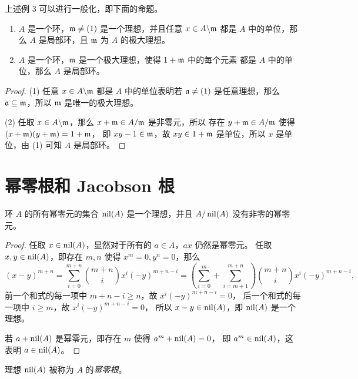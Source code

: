 上述例 3 可以进行一般化，即下面的命题。

\begin{proposition}
  \mbox{}
  \begin{enumerate}
    \item $A$ 是一个环，$\mathfrak{m}\neq (1)$ 是一个理想，并且任意 $x\in A\backslash\mathfrak{m}$
    都是 $A$ 中的单位，那么 $A$ 是局部环，且 $\mathfrak{m}$ 为 $A$ 的极大理想。
    \item $A$ 是一个环，$\mathfrak{m}$ 是一个极大理想，使得 $1+\mathfrak{m}$ 中的每个元素
    都是 $A$ 中的单位，那么 $A$ 是局部环。
  \end{enumerate}
\end{proposition}
\begin{proof}
  (1) 任意 $x\in A\backslash\mathfrak{m}$ 都是 $A$ 中的单位表明若 $\mathfrak{a}\neq (1)$
  是任意理想，那么 $\mathfrak{a}\subseteq \mathfrak{m}$，所以 $\mathfrak{m}$ 是唯一的极大理想。

  (2) 任取 $x\in A\backslash\mathfrak{m}$，那么 $x+\mathfrak{m}\in A/\mathfrak{m}$ 是非零元，所以
  存在 $y+\mathfrak{m}\in A/\mathfrak{m}$ 使得 $(x+\mathfrak{m})(y+\mathfrak{m})=1+\mathfrak{m}$，
  即 $xy-1\in\mathfrak{m}$，故 $xy\in 1+\mathfrak{m}$ 是单位，所以 $x$ 是单位，由 (1)
  可知 $A$ 是局部环。
\end{proof}

\section{幂零根和 Jacobson 根}

\begin{proposition}
  环 $A$ 的所有幂零元的集合 $\operatorname{nil}(A)$ 是一个理想，并且
  $A/\operatorname{nil}(A)$ 没有非零的幂零元。
\end{proposition}
\begin{proof}
  任取 $x\in\operatorname{nil}(A)$，显然对于所有的 $a\in A$，$ax$ 仍然是幂零元。
  任取 $x,y\in\operatorname{nil}(A)$，即存在 $m,n$ 使得 $x^m=0,y^n=0$，那么
  \[
    (x-y)^{m+n}=\sum_{i=0}^{m+n}\binom{m+n}{i}x^i(-y)^{m+n-i}  
    =\left(\sum_{i=0}^m +\sum_{i=m+1}^{m+n}\right)\binom{m+n}{i}x^i(-y)^{m+n-i}  ,
  \]
  前一个和式的每一项中 $m+n-i\geq n$，故 $x^i(-y)^{m+n-i}=0$，
  后一个和式的每一项中 $i\geq m$，故 $x^i(-y)^{m+n-i}=0$，
  所以 $x-y\in\operatorname{nil}(A)$，即 $\operatorname{nil}(A)$ 是一个理想。

  若 $a+\operatorname{nil}(A)$ 是幂零元，即存在 $m$ 使得 $a^m+\operatorname{nil}(A)=0$，
  即 $a^m\in\operatorname{nil}(A)$，这表明 $a\in\operatorname{nil}(A)$。
\end{proof}

\begin{definition}
  理想 $\operatorname{nil}(A)$ 被称为 $A$ 的\emph{幂零根}。
\end{definition}

